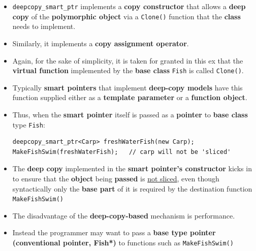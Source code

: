 \documentclass[10pt]{article}
\newcommand{\pbreak}{\vspace{30pt}}
\begin{document}
\begin{itemize}
	\item \verb|deepcopy_smart_ptr| implements a \textbf{copy constructor} that allows a \textbf{deep copy} of the \textbf{polymorphic object} via a \verb|Clone()| function that the \textbf{class} needs to implement.

	\item Similarly, it implements a \textbf{copy assignment operator}.

	\item Again, for the sake of simplicity, it is taken for granted in this ex that the \textbf{virtual function} implemented by the \textbf{base class} \verb|Fish| is called \verb|Clone()|.

	\item Typically \textbf{smart pointers} that implement \textbf{deep-copy models} have this function supplied either as a \textbf{template parameter} or a \textbf{function object}.

		\pbreak

	\item Thus, when the \textbf{smart pointer} itself is passed as a \textbf{pointer} to \textbf{base class} type \verb|Fish|:
		\begin{verbatim}
deepcopy_smart_ptr<Carp> freshWaterFish(new Carp);
MakeFishSwim(freshWaterFish);	// carp will not be 'sliced'
		\end{verbatim}

		\pbreak

	\item The \textbf{deep copy} implemented in the \textbf{smart pointer's constructor} kicks in to ensure that the \textbf{object} being \textbf{passed} is \underline{not sliced}, even though syntactically only the \textbf{base part} of it is required by the destination function \verb|MakeFishSwim()|

		\pbreak

	\item The disadvantage of the \textbf{deep-copy-based} mechanism is performance.
	\item Instead the programmer may want to pass a \textbf{base type pointer (conventional pointer, Fish*)} to functions such as \verb|MakeFishSwim()|

\end{itemize}

\newpage
\end{document}
